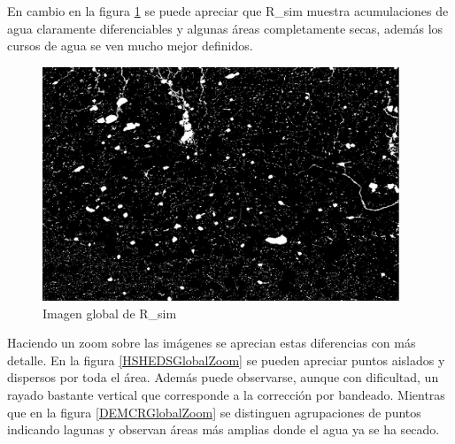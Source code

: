 \documentclass[10pt,a4paper, twoside]{report}
\begin{document}
En cambio en la figura \ref{DEMCRGlobal} se puede apreciar que R\_sim muestra acumulaciones de agua claramente diferenciables y algunas áreas completamente secas, además los cursos de agua se ven mucho mejor definidos.

\begin{figure}[!htb]
   \centering      
   \includegraphics[width=0.95\textwidth]{imagenes/DEMCRGlobal.jpg}
 \caption{Imagen global de R\_sim}
 \label{DEMCRGlobal}
\end{figure}

Haciendo un zoom sobre las imágenes se aprecian estas diferencias con más detalle. En la figura \ref{HSHEDSGlobalZoom} se pueden apreciar puntos aislados y dispersos por toda el área. Además puede observarse, aunque con dificultad, un rayado bastante vertical que corresponde a la corrección por bandeado. Mientras que en la figura \ref{DEMCRGlobalZoom} se distinguen agrupaciones de puntos indicando lagunas y observan áreas más amplias donde el agua ya se ha secado.
\end{document}
